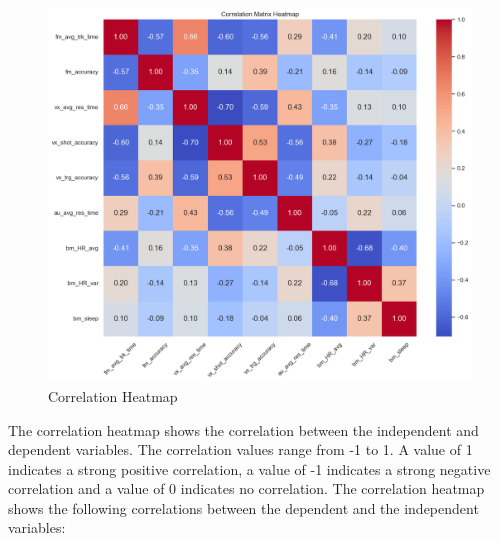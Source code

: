 \begin{figure}[H]
    \centering
    \includegraphics[width=1\textwidth]{images/correlation.png}
    \caption{Correlation Heatmap}
    \label{fig:correlation_heatmap}
\end{figure}

The correlation heatmap shows the correlation between the independent and dependent variables. The correlation values range from -1 to 1. A value of 1 indicates 
a strong positive correlation, a value of -1 indicates a strong negative correlation and a value of 0 indicates no correlation. The correlation heatmap shows 
the following correlations between the dependent and the independent variables:

